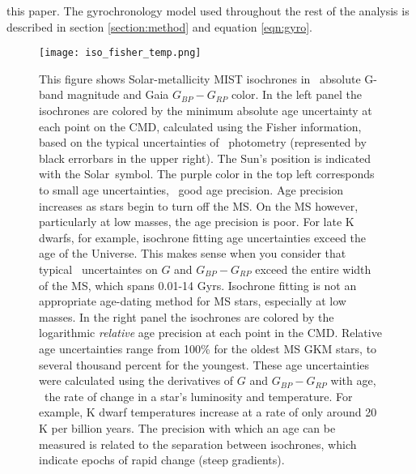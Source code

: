this paper.
The gyrochronology model used throughout the rest of the analysis is described
in section \ref{section:method} and equation \ref{eqn:gyro}.


\begin{figure}
  \caption{
    This figure shows Solar-metallicity MIST isochrones in \Gaia\ absolute
    G-band magnitude and Gaia $G_{BP} - G_{RP}$ color.
    In the left panel the isochrones are colored by the minimum absolute age
    uncertainty at each point on the CMD, calculated using the Fisher
    information, based on the typical uncertainties of \Gaia\ photometry
    (represented by black errorbars in the upper right).
    The Sun's position \citep{casagrande2018} is indicated with the Solar\
    symbol.
    The purple color in the top left corresponds to small age uncertainties,
    \ie\ good age precision.
    Age precision increases as stars begin to turn off the MS.
    On the MS however, particularly at low masses, the age precision is poor.
    For late K dwarfs, for example, isochrone fitting age uncertainties exceed
    the age of the Universe.
    This makes sense when you consider that typical \Gaia\ uncertaintes on $G$
    and $G_{BP} - G_{RP}$ exceed the entire width of the MS, which spans
    0.01-14 Gyrs.
    Isochrone fitting is not an appropriate age-dating method for MS stars,
    especially at low masses.
    In the right panel the isochrones are colored by the logarithmic
    {\it relative} age precision at each point in the CMD.
    Relative age uncertainties range from 100\% for the oldest MS GKM stars,
    to several thousand percent for the youngest.
    These age uncertainties were calculated using the derivatives of $G$ and
    $G_{BP} - G_{RP}$ with age, \ie\ the rate of change in a star's luminosity
    and temperature.
    For example, K dwarf temperatures increase at a rate of only around 20 K
    per billion years.
    The precision with which an age can be measured is related to the
    separation between isochrones, which indicate epochs of rapid change
    (steep gradients).\label{fig:fischer_iso}
}
  \centering
    \texttt{[image: iso\_fisher\_temp.png]}
\label{fig:iso_fisher}
\end{figure}

